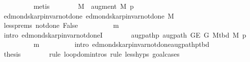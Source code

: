 \begin{isabellebody}
\ \ \ \ \ \ \ \ \isamarkupfalse%
\ metis\isanewline
\ \ \ \ \ \ \isamarkupfalse%
\ {\isacharquery}{\kern0pt}M\ {\isacharequal}{\kern0pt}\ {\isachardoublequoteopen}augment\ M\ {\isacharquery}{\kern0pt}p{\isachardoublequoteclose}\isanewline
\ \ \ \ \ \ \isamarkupfalse%
\ edmonds{\isacharunderscore}{\kern0pt}karp{\isacharunderscore}{\kern0pt}invar{\isacharunderscore}{\kern0pt}not{\isacharunderscore}{\kern0pt}done{\isacharunderscore}{\kern0pt}{}{\isacharcolon}{\kern0pt}\ {\isachardoublequoteopen}edmonds{\isacharunderscore}{\kern0pt}karp{\isacharunderscore}{\kern0pt}invar{\isacharunderscore}{\kern0pt}not{\isacharunderscore}{\kern0pt}done{\isacharunderscore}{\kern0pt}{}{\isacharprime}{\kern0pt}{\isacharprime}{\kern0pt}\ M{\isachardoublequoteclose}\isanewline
\ \ \ \ \ \ \ \ \isamarkupfalse%
\ less{\isachardot}{\kern0pt}prems\ not{\isacharunderscore}{\kern0pt}done{\isacharunderscore}{\kern0pt}{}\ False\isanewline
\ \ \ \ \ \ \ \ \isamarkupfalse%
\ m\isanewline
\ \ \ \ \ \ \ \ \isamarkupfalse%
\ {\isacharparenleft}{\kern0pt}intro\ edmonds{\isacharunderscore}{\kern0pt}karp{\isacharunderscore}{\kern0pt}invar{\isacharunderscore}{\kern0pt}not{\isacharunderscore}{\kern0pt}done{\isacharunderscore}{\kern0pt}{}I{\isacharunderscore}{\kern0pt}{}{\isacharparenright}{\kern0pt}\isanewline
\ \ \ \ \ \ \isamarkupfalse%
\ augpath{\isacharunderscore}{\kern0pt}p{\isacharcolon}{\kern0pt}\ {\isachardoublequoteopen}augpath\ {\isacharparenleft}{\kern0pt}G{\isachardot}{\kern0pt}E\ G{\isacharparenright}{\kern0pt}\ {\isacharparenleft}{\kern0pt}M{\isacharunderscore}{\kern0pt}tbd\ M{\isacharparenright}{\kern0pt}\ {\isacharquery}{\kern0pt}p{\isachardoublequoteclose}\isanewline
\ \ \ \ \ \ \ \ \isamarkupfalse%
\ m\isanewline
\ \ \ \ \ \ \ \ \isamarkupfalse%
\ {\isacharparenleft}{\kern0pt}intro\ edmonds{\isacharunderscore}{\kern0pt}karp{\isacharunderscore}{\kern0pt}invar{\isacharunderscore}{\kern0pt}not{\isacharunderscore}{\kern0pt}done{\isacharunderscore}{\kern0pt}{}{\isachardot}{\kern0pt}augpath{\isacharunderscore}{\kern0pt}p{\isacharunderscore}{\kern0pt}tbd{\isacharparenright}{\kern0pt}\isanewline
\ \ \ \ \ \ \isamarkupfalse%
\ {\isacharquery}{\kern0pt}thesis\isanewline
\ \ \ \ \ \ \isamarkupfalse%
\ {\isacharparenleft}{\kern0pt}rule\ loop{\isacharprime}{\kern0pt}{\isachardot}{\kern0pt}domintros{\isacharcomma}{\kern0pt}\ rule\ less{\isachardot}{\kern0pt}hyps{\isacharcomma}{\kern0pt}\ goal{\isacharunderscore}{\kern0pt}cases{\isacharparenright}{\kern0pt}\isanewline

\end{isabellebody}
